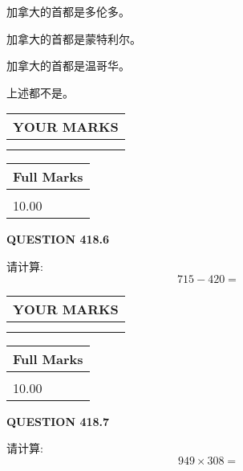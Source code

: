 \documentclass{ctexart}
\begin{document}
 
加拿大的首都是多伦多。
 
 
加拿大的首都是蒙特利尔。
 
 
加拿大的首都是温哥华。
 
 
 上述都不是。
 
 
  
\vspace{0.2in}
  
\noindent\begin{tabular}{|l|}
\hline
 YOUR MARKS  \\
\hline
 \\ 
 \\ 
\hline
\end{tabular}
\hspace{0.05in} \begin{tabular}{|l|}
\hline
 Full Marks  \\
\hline
 \\ 
10.00 \\
\hline
\end{tabular}
{\textbf{\Large{QUESTION
418.6 
}}}
  
  
 
请计算:
\begin{equation}
715 -   %
420 = \nonumber
\end{equation}
 

 

 
  
\vspace{0.2in}
  
\noindent\begin{tabular}{|l|}
\hline
 YOUR MARKS  \\
\hline
 \\ 
 \\ 
\hline
\end{tabular}
\hspace{0.05in} \begin{tabular}{|l|}
\hline
 Full Marks  \\
\hline
 \\ 
10.00 \\
\hline
\end{tabular}
{\textbf{\Large{QUESTION
418.7 
}}}
  
  
 
请计算:
\begin{equation}
949  \times    %
308 = \nonumber
\end{equation}
 
\end{document}
